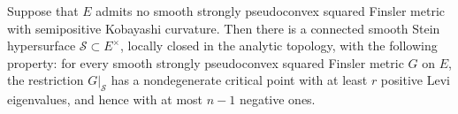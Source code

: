 \begin{theorem}\label{thm:fixed-stein-finsler-hypersurface}
Suppose that $E$ admits no smooth strongly pseudoconvex squared Finsler metric with semipositive Kobayashi curvature. Then there is a connected smooth Stein hypersurface $\mathcal S\subset E^\times$, locally closed in the analytic topology, with the following property: for every smooth strongly pseudoconvex squared Finsler metric $G$ on $E$, the restriction $G|_{\mathcal S}$ has a nondegenerate critical point with at least $r$ positive Levi eigenvalues, and hence with at most $n-1$ negative ones.
\end{theorem}
